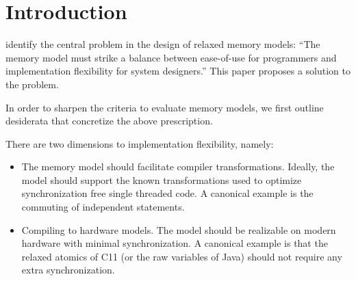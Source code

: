 \newcommand{\oota}{{\sc OOTA}}
\section{Introduction}
\citet{Manson:2005:JMM:1047659.1040336} identify the central problem in the design of relaxed memory models: ``The memory model must strike a balance between ease-of-use for programmers and implementation flexibility for system designers.''   This paper proposes a solution to the problem.

In order to sharpen the criteria to evaluate memory models, we first outline desiderata  that concretize the above prescription.  

There are two dimensions to implementation flexibility, namely:
\begin{itemize}
\item The memory model should facilitate compiler transformations.    Ideally, the model should support the known transformations used to optimize  synchronization free single threaded code.  A canonical example is the  commuting of independent statements.

\item Compiling to hardware models.  The model should be realizable on modern hardware with minimal synchronization.  A canonical example is that the relaxed atomics of C11 (or the raw variables of Java) should not require any extra synchronization.
\end{itemize}

